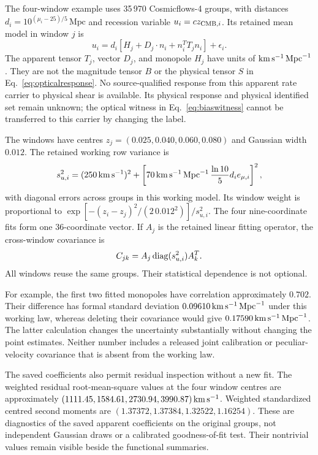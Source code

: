 The four-window example uses 35\,970 Cosmicflows-4 groups, with distances $d_i=10^{(\mu_i-25)/5}\,\mathrm{Mpc}$ and recession variable $u_i=cz_{{\rm CMB},i}$. Its retained mean model in window $j$ is
\begin{equation}
 u_i=d_i\left[H_j+D_j\cdot n_i+n_i^TT_jn_i\right]+\epsilon_i.
 \label{eq:apphubble}
\end{equation}
The apparent tensor $T_j$, vector $D_j$, and monopole $H_j$ have units of $\mathrm{km}\,\mathrm{s}^{-1}\,\mathrm{Mpc}^{-1}$. They are not the magnitude tensor $B$ or the physical tensor $S$ in Eq.~\eqref{eq:opticalresponse}. No source-qualified response from this apparent rate carrier to physical shear is available. Its physical response and physical identified set remain unknown; the optical witness in Eq.~\eqref{eq:biaswitness} cannot be transferred to this carrier by changing the label.

The windows have centres $z_j=(0.025,0.040,0.060,0.080)$ and Gaussian width $0.012$. The retained working row variance is
\begin{equation}
 s_{u,i}^2=(250\,\mathrm{km}\,\mathrm{s}^{-1})^2+
 \left[70\,\mathrm{km}\,\mathrm{s}^{-1}\,\mathrm{Mpc}^{-1}\,\frac{\ln10}{5}d_i e_{\mu,i}\right]^2,
 \label{eq:ratevariance}
\end{equation}
with diagonal errors across groups in this working model. Its window weight is proportional to $\exp[-(z_i-z_j)^2/(2\,0.012^2)]/s_{u,i}^2$. The four nine-coordinate fits form one 36-coordinate vector. If $A_j$ is the retained linear fitting operator, the cross-window covariance is
\begin{equation}
 C_{jk}=A_j\operatorname{diag}(s_{u,i}^2)A_k^T.
 \label{eq:crosswindow}
\end{equation}
All windows reuse the same groups. Their statistical dependence is not optional.

For example, the first two fitted monopoles have correlation approximately $0.702$. Their difference has formal standard deviation $0.09610\,\mathrm{km}\,\mathrm{s}^{-1}\,\mathrm{Mpc}^{-1}$ under this working law, whereas deleting their covariance would give $0.17590\,\mathrm{km}\,\mathrm{s}^{-1}\,\mathrm{Mpc}^{-1}$. The latter calculation changes the uncertainty substantially without changing the point estimates. Neither number includes a released joint calibration or peculiar-velocity covariance that is absent from the working law.

The saved coefficients also permit residual inspection without a new fit. The weighted residual root-mean-square values at the four window centres are approximately $(1111.45,1584.61,2730.94,3990.87)\,\mathrm{km}\,\mathrm{s}^{-1}$. Weighted standardized centred second moments are $(1.37372,1.37384,1.32522,1.16254)$. These are diagnostics of the saved apparent coefficients on the original groups, not independent Gaussian draws or a calibrated goodness-of-fit test. Their nontrivial values remain visible beside the functional summaries.

